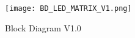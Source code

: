 \begin{figure*}[h]		
	\texttt{[image: BD\_LED\_MATRIX\_V1.png]}
	\caption{Block Diagram V1.0}
	
\end{figure*}	
	
\begin{multicols}{2}

\end{multicols}	 
			
				  




